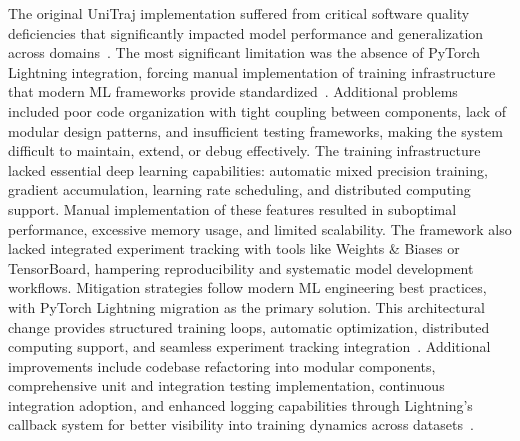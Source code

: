 The original UniTraj implementation suffered from critical software quality deficiencies that significantly impacted model performance and generalization across domains~\cite{metadriveLi2022}. The most significant limitation was the absence of PyTorch Lightning integration, forcing manual implementation of training infrastructure that modern ML frameworks provide standardized~\cite{falcon2019pytorch}. Additional problems included poor code organization with tight coupling between components, lack of modular design patterns, and insufficient testing frameworks, making the system difficult to maintain, extend, or debug effectively.
The training infrastructure lacked essential deep learning capabilities: automatic mixed precision training, gradient accumulation, learning rate scheduling, and distributed computing support. Manual implementation of these features resulted in suboptimal performance, excessive memory usage, and limited scalability. The framework also lacked integrated experiment tracking with tools like Weights \& Biases or TensorBoard, hampering reproducibility and systematic model development workflows.
Mitigation strategies follow modern ML engineering best practices, with PyTorch Lightning migration as the primary solution. This architectural change provides structured training loops, automatic optimization, distributed computing support, and seamless experiment tracking integration~\cite{falcon2019pytorch}. Additional improvements include codebase refactoring into modular components, comprehensive unit and integration testing implementation, continuous integration adoption, and enhanced logging capabilities through Lightning's callback system for better visibility into training dynamics across datasets~\cite{unitrajFeng2024, scenarionetLi2023}.

